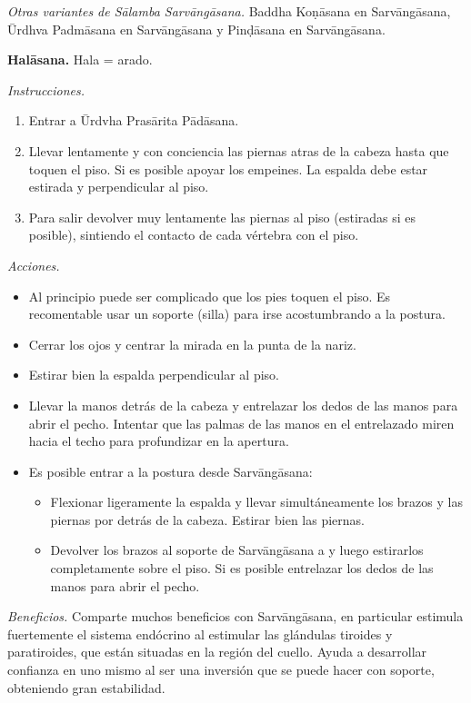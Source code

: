 \emph{Otras variantes de Sālamba
Sarvāngāsana.} Baddha Koṇāsana en
Sarvāngāsana, Ūrdhva Padmāsana en
Sarvāngāsana y Pinḍāsana en Sarvāngāsana.

\medskip\noindent\textbf{Halāsana.}
Hala = arado.

\emph{Instrucciones.}
\begin{enumerate}
\item Entrar a Ūrdvha Prasārita Pādāsana.
\item Llevar lentamente y con conciencia las
piernas atras de la cabeza hasta que toquen
el piso. Si es posible apoyar los empeines.
La espalda debe estar estirada y
perpendicular al piso.
\item Para salir devolver muy lentamente las
piernas al piso (estiradas si es posible),
sintiendo el contacto de cada vértebra con el
piso.
\end{enumerate}

\emph{Acciones.}
\begin{itemize}
\item Al principio puede ser complicado que
los pies toquen el piso. Es recomentable usar
un soporte (silla) para irse acostumbrando a
la postura.
\item Cerrar los ojos y centrar la mirada en
la punta de la nariz.
\item Estirar bien la espalda perpendicular
al piso.
\item Llevar la manos detrás de la cabeza y
entrelazar los dedos de las manos para abrir
el pecho. Intentar que las palmas de las
manos en el entrelazado miren hacia el techo
para profundizar en la apertura.
\item Es posible entrar a la postura desde
Sarvāngāsana:
\begin{itemize}
\item Flexionar ligeramente la espalda y
llevar simultáneamente los brazos y las
piernas por detrás de la cabeza. Estirar bien
las piernas.
\item Devolver los brazos al soporte de
Sarvāngāsana a y luego estirarlos
completamente sobre el piso. Si es posible
entrelazar los dedos de las manos para abrir
el pecho.
\end{itemize}
\end{itemize}

\emph{Beneficios.} Comparte muchos beneficios
con Sarvāngāsana, en particular estimula
fuertemente el sistema endócrino al estimular
las glándulas tiroides y paratiroides, que
están situadas en la región del cuello. Ayuda
a desarrollar confianza en uno mismo al ser
una inversión que se puede hacer con soporte,
obteniendo gran estabilidad.

